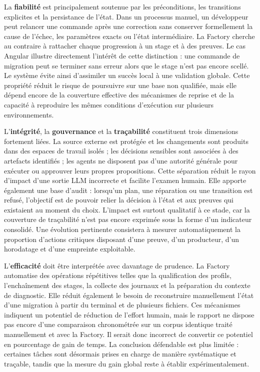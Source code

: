 La \textbf{fiabilité} est principalement soutenue par les préconditions, les transitions explicites et la persistance de l'état. Dans un processus manuel, un développeur peut relancer une commande après une correction sans conserver formellement la cause de l'échec, les paramètres exacts ou l'état intermédiaire. La Factory cherche au contraire à rattacher chaque progression à un stage et à des preuves. Le cas Angular illustre directement l'intérêt de cette distinction : une commande de migration peut se terminer sans erreur alors que le stage n'est pas encore scellé. Le système évite ainsi d'assimiler un succès local à une validation globale. Cette propriété réduit le risque de poursuivre sur une base non qualifiée, mais elle dépend encore de la couverture effective des mécanismes de reprise et de la capacité à reproduire les mêmes conditions d'exécution sur plusieurs environnements.

L'\textbf{intégrité}, la \textbf{gouvernance} et la \textbf{traçabilité} constituent trois dimensions fortement liées. La source externe est protégée et les changements sont produits dans des espaces de travail isolés ; les décisions sensibles sont associées à des artefacts identifiés ; les agents ne disposent pas d'une autorité générale pour exécuter ou approuver leurs propres propositions. Cette séparation réduit le rayon d'impact d'une sortie LLM incorrecte et facilite l'examen humain. Elle apporte également une base d'audit : lorsqu'un plan, une réparation ou une transition est refusé, l'objectif est de pouvoir relier la décision à l'état et aux preuves qui existaient au moment du choix. L'impact est surtout qualitatif à ce stade, car la couverture de traçabilité n'est pas encore exprimée sous la forme d'un indicateur consolidé. Une évolution pertinente consistera à mesurer automatiquement la proportion d'actions critiques disposant d'une preuve, d'un producteur, d'un horodatage et d'une empreinte exploitable.

L'\textbf{efficacité} doit être interprétée avec davantage de prudence. La Factory automatise des opérations répétitives telles que la qualification des profils, l'enchaînement des stages, la collecte des journaux et la préparation du contexte de diagnostic. Elle réduit également le besoin de reconstruire manuellement l'état d'une migration à partir du terminal et de plusieurs fichiers. Ces mécanismes indiquent un potentiel de réduction de l'effort humain, mais le rapport ne dispose pas encore d'une comparaison chronométrée sur un corpus identique traité manuellement et avec la Factory. Il serait donc incorrect de convertir ce potentiel en pourcentage de gain de temps. La conclusion défendable est plus limitée : certaines tâches sont désormais prises en charge de manière systématique et traçable, tandis que la mesure du gain global reste à établir expérimentalement.


